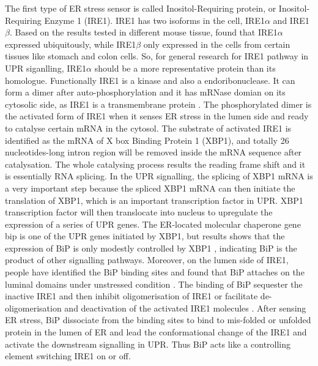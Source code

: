The first type of ER stress sensor is called Inositol-Requiring protein, or Inositol-Requiring Enzyme 1 (IRE1). IRE1 has two isoforms in the cell, IRE1$\alpha$ and IRE1$\beta$. Based on the results tested in different mouse tissue, \citet{bertolotti2001increased} found that IRE1$\alpha$ expressed ubiquitously, while IRE1$\beta$ only expressed in the cells from certain tissues like stomach and colon cells. So, for general research for IRE1 pathway in UPR siganlling, IRE1$\alpha$ should be a more representative protein than its homologue. Functionally IRE1 is a kinase and also a endoribonuclease. It can form a dimer after auto-phosphorylation and it has mRNase domian on its cytosolic side, as IRE1 is a transmembrane protein \citep{prischi2014phosphoregulation}. The phosphorylated dimer is the activated form of IRE1 when it senses ER stress in the lumen side and ready to catalyse certain mRNA in the cytosol. The substrate of activated IRE1 is identified as the mRNA of X box Binding Protein 1 (XBP1), and totally 26 nucleotides-long intron region will be removed inside the mRNA sequence after catalysation. The whole catalysing process results the reading frame shift and it is essentially RNA splicing. In the UPR signalling, the splicing of XBP1 mRNA is a very important step because the spliced XBP1 mRNA can then initiate the translation of XBP1, which is an important transcription factor in UPR. XBP1 transcription factor will then translocate into nucleus to upregulate the expression of a series of UPR genes. The ER-located molecular chaperone gene bip is one of the UPR genes initiated by XBP1, but results shows that the expression of BiP is only modestly controlled by XBP1 \citep{lee2003xbp}, indicating BiP is the product of other signalling pathways. Moreover, on the lumen side of IRE1, people have identified the BiP binding sites and found that BiP attaches on the luminal domains under unstressed condition \citep{kimata2004role}. The binding of BiP sequester the inactive IRE1 and then inhibit oligomerisation of IRE1 or facilitate de-oligomerisation and deactivation of the activated IRE1 molecules \citep{pincus2010bip}. After sensing ER stress, BiP dissociate from the binding sites to bind to mis-folded or unfolded protein in the lumen of ER and lead the conformational change of the IRE1 and activate the downstream signalling in UPR. Thus BiP acts like a controlling element switching IRE1 on or off. \\
